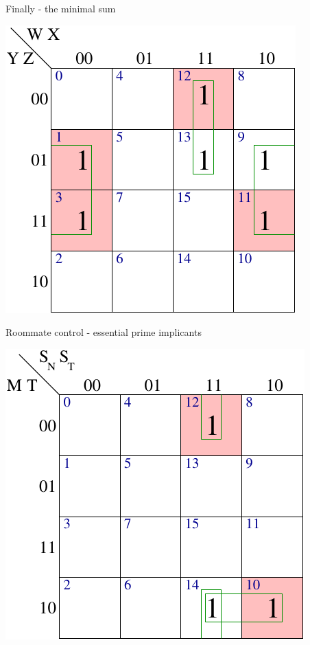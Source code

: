 \begin{frame}{Finally - the minimal sum}
  \begin{center}
    \includegraphics[scale=0.7]{4VariableKMapExampleEssentialPrimeImplicant}
  \end{center}
\end{frame}

\begin{frame}{Roommate control - essential prime implicants}
  \begin{center}
    \includegraphics[scale=0.7]{4VariableRoommateControlKMapEssentialPrimeImplicant}
  \end{center}
\end{frame}

